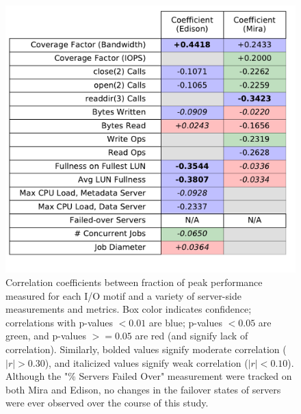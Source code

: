 \begin{figure}[t]
    \centering
    \includegraphics[width=\columnwidth]{figs/correlation_table.pdf}
    \caption{Correlation coefficients between fraction of peak performance measured for each I/O motif and a variety of server-side measurements and metrics.  Box color indicates confidence; correlations with p-values $< 0.01$ are blue; p-values $< 0.05$ are green, and p-values $>= 0.05$ are red (and signify lack of correlation).  Similarly, bolded values signify moderate correlation ($|r| > 0.30$), and italicized values signify weak correlation ($|r| < 0.10$).  Although the "\% Servers Failed Over" measurement were tracked on both Mira and Edison, no changes in the
    failover states of servers were ever observed over the course of this study.
    }
    \label{fig:correlation-table}
\end{figure}

